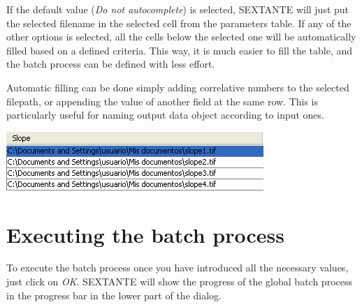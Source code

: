 If the default value (\emph{Do not autocomplete}) is selected, SEXTANTE will just put the selected filename in the selected cell from the parameters table. If any of the other options is selected, all the cells below the selected one will be automatically filled based on a defined criteria. This way, it is much easier to fill the table, and the batch process can be defined with less effort.

Automatic filling can be done simply adding correlative numbers to the selected filepath, or appending the value of another field at the same row. This is particularly useful for naming output data object according to input ones.


\begin{center}
\includegraphics[width=.6\columnwidth]{batch_processing_filepath.png}
\end{center}


\section{Executing the batch process}

To execute the batch process once you have introduced all the necessary values, just click on \emph{OK}. SEXTANTE will show the progress of the global batch process in the progress bar in the lower part of the dialog.
%
%

